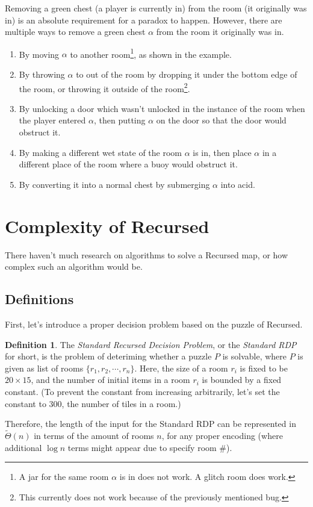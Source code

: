\documentclass[a4paper]{article}
\theoremstyle{definition}
\newtheorem{definition}{Definition}[section]
\begin{document}
Removing a green chest (a player is currently in) from the room (it originally was in) is an absolute requirement for a paradox to happen.
However, there are multiple ways to remove a green chest $\alpha$ from the room it originally was in.
\begin{enumerate}
\item By moving $\alpha$ to another room\footnote{A jar for the same room $\alpha$ is in does not work. A glitch room does work.}, as shown in the example.
\item By throwing $\alpha$ to out of the room by dropping it under the bottom edge of the room,
or throwing it outside of the room\footnote{This currently does not work because of the previously mentioned bug.}.
\item By unlocking a door which wasn't unlocked in the instance of the room when the player entered $\alpha$,
then putting $\alpha$ on the door so that the door would obstruct it.
\item By making a different wet state of the room $\alpha$ is in, then place $\alpha$ in a different place of the room where a buoy would obstruct it.
\item By converting it into a normal chest by submerging $\alpha$ into acid.
\end{enumerate}

\section{Complexity of Recursed}
There haven't much research on algorithms to solve a Recursed map, or how complex such an algorithm would be.

\subsection{Definitions}
First, let's introduce a proper decision problem based on the puzzle of Recursed.
\begin{definition}
The \emph{Standard Recursed Decision Problem}, or the \emph{Standard RDP} for short, is the problem of deteriming
whether a puzzle $P$ is solvable, where $P$ is given as list of rooms $\{r_1, r_2, \cdots, r_n\}$.
Here, the size of a room $r_i$ is fixed to be $20 \times 15$, and the number of initial items in a room $r_i$ is bounded by
a fixed constant. (To prevent the constant from increasing arbitrarily, let's set the constant to $300$, the number of tiles in a room.)
\end{definition}
Therefore, the length of the input for the Standard RDP can be represented in $\tilde{\Theta}(n)$ in terms of the amount
of rooms $n$, for any proper encoding (where additional $\log n$ terms might appear due to specify room \#).
\end{document}
